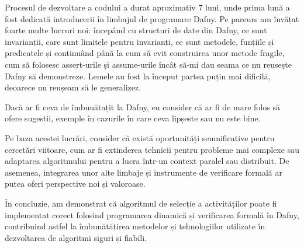 Procesul de dezvoltare a codului a durat aproximativ 7 luni, unde prima lună a fost dedicată introducerii în limbajul de programare Dafny. 
Pe parcurs am învățat foarte multe lucruri noi: începând cu structuri de date din Dafny, ce sunt invarianții, care sunt limitele pentru invarianți, ce sunt metodele, funțiile și predicatele și continuând până la cum să evit construirea unor metode fragile, cum să folosesc assert-urile și assume-urile încât să-mi dau seama ce nu reusește Dafny să demonstreze. Lemele au fost la început partea puțin mai dificilă, deoarece nu reușeam să le generalizez.

Dacă ar fi ceva de îmbunătațit la Dafny, eu consider că ar fi de mare folos să ofere sugestii, exemple în cazurile în care ceva lipșeste sau nu este bine.   

Pe baza acestei lucrări, consider că există oportunități semnificative pentru cercetări viitoare, cum ar fi extinderea tehnicii pentru probleme mai complexe sau adaptarea algoritmului pentru a lucra într-un context paralel sau distribuit. De asemenea, integrarea unor alte limbaje și instrumente de verificare formală ar putea oferi perspective noi și valoroase.

În concluzie, am demonstrat că algoritmul de selecție a activităților poate fi implementat corect folosind programarea dinamică și verificarea formală în Dafny, contribuind astfel la îmbunătățirea metodelor și tehnologiilor utilizate în dezvoltarea de algoritmi siguri și fiabili.